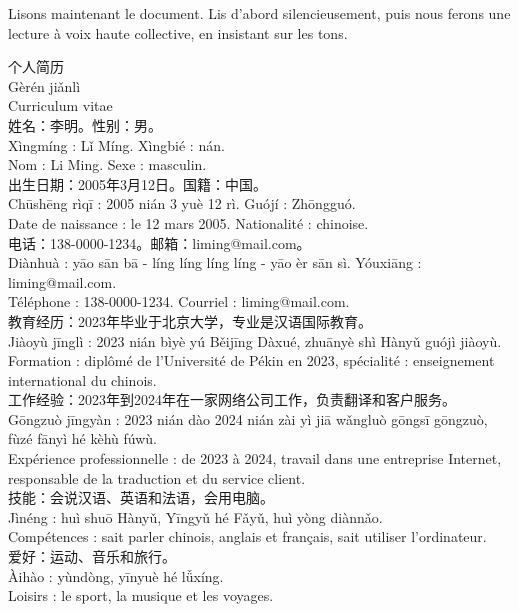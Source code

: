 \documentclass[11pt]{article}
\begin{document}
Lisons maintenant le document. Lis d'abord silencieusement, puis nous ferons une lecture à voix haute collective, en insistant sur les tons.

\begin{textebox}
个人简历\\
Gèrén jiǎnlì\\
Curriculum vitae\\[0.4em]
姓名：李明。性别：男。\\
Xìngmíng : Lǐ Míng. Xìngbié : nán.\\
Nom : Li Ming. Sexe : masculin.\\[0.4em]
出生日期：2005年3月12日。国籍：中国。\\
Chūshēng rìqī : 2005 nián 3 yuè 12 rì. Guójí : Zhōngguó.\\
Date de naissance : le 12 mars 2005. Nationalité : chinoise.\\[0.4em]
电话：138-0000-1234。邮箱：liming@mail.com。\\
Diànhuà : yāo sān bā - líng líng líng líng - yāo èr sān sì. Yóuxiāng : liming@mail.com.\\
Téléphone : 138-0000-1234. Courriel : liming@mail.com.\\[0.4em]
教育经历：2023年毕业于北京大学，专业是汉语国际教育。\\
Jiàoyù jīnglì : 2023 nián bìyè yú Běijīng Dàxué, zhuānyè shì Hànyǔ guójì jiàoyù.\\
Formation : diplômé de l'Université de Pékin en 2023, spécialité : enseignement international du chinois.\\[0.4em]
工作经验：2023年到2024年在一家网络公司工作，负责翻译和客户服务。\\
Gōngzuò jīngyàn : 2023 nián dào 2024 nián zài yì jiā wǎngluò gōngsī gōngzuò, fùzé fānyì hé kèhù fúwù.\\
Expérience professionnelle : de 2023 à 2024, travail dans une entreprise Internet, responsable de la traduction et du service client.\\[0.4em]
技能：会说汉语、英语和法语，会用电脑。\\
Jìnéng : huì shuō Hànyǔ, Yīngyǔ hé Fǎyǔ, huì yòng diànnǎo.\\
Compétences : sait parler chinois, anglais et français, sait utiliser l'ordinateur.\\[0.4em]
爱好：运动、音乐和旅行。\\
Àihào : yùndòng, yīnyuè hé lǚxíng.\\
Loisirs : le sport, la musique et les voyages.
\end{textebox}
\end{document}
